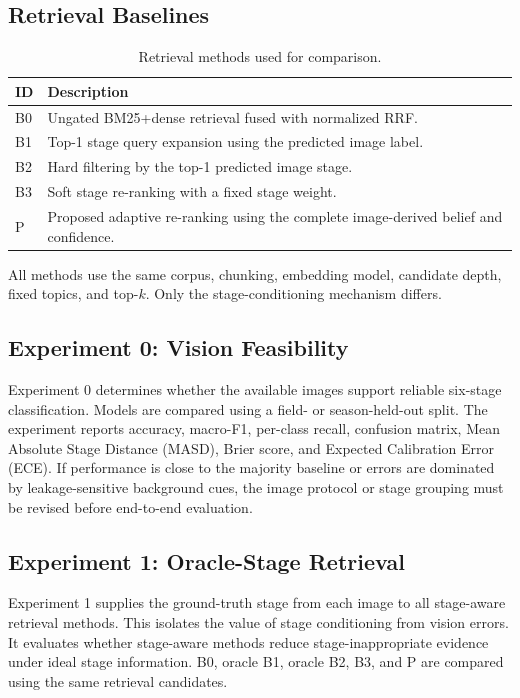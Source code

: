 \documentclass[conference]{IEEEtran}
\begin{document}
\subsection{Retrieval Baselines}
\begin{table}[t]
\caption{Retrieval methods used for comparison.}
\label{tab:baselines}
\centering
\footnotesize
\begin{tabular}{p{}p{}}
\toprule
ID & Description \\
\midrule
B0 & Ungated BM25+dense retrieval fused with normalized RRF. \\
B1 & Top-1 stage query expansion using the predicted image label. \\
B2 & Hard filtering by the top-1 predicted image stage. \\
B3 & Soft stage re-ranking with a fixed stage weight. \\
P & Proposed adaptive re-ranking using the complete image-derived belief and confidence. \\
\bottomrule
\end{tabular}
\end{table}

All methods use the same corpus, chunking, embedding model, candidate depth, fixed topics, and top-$k$. Only the stage-conditioning mechanism differs.

\subsection{Experiment 0: Vision Feasibility}
Experiment 0 determines whether the available images support reliable six-stage classification. Models are compared using a field- or season-held-out split. The experiment reports accuracy, macro-F1, per-class recall, confusion matrix, Mean Absolute Stage Distance (MASD), Brier score, and Expected Calibration Error (ECE). If performance is close to the majority baseline or errors are dominated by leakage-sensitive background cues, the image protocol or stage grouping must be revised before end-to-end evaluation.

\subsection{Experiment 1: Oracle-Stage Retrieval}
Experiment 1 supplies the ground-truth stage from each image to all stage-aware retrieval methods. This isolates the value of stage conditioning from vision errors. It evaluates whether stage-aware methods reduce stage-inappropriate evidence under ideal stage information. B0, oracle B1, oracle B2, B3, and P are compared using the same retrieval candidates.
\end{document}
